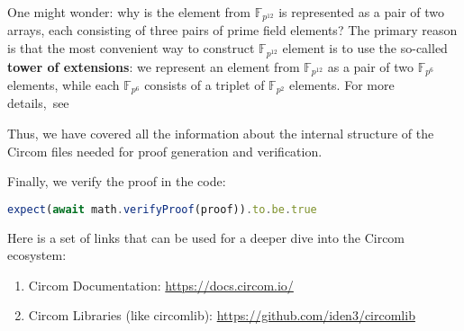 \documentclass[../lecture-notes.tex]{subfiles}
\begin{document}
    \begin{remark}
        One might wonder: why is the element from $\mathbb{F}_{p^{12}}$ is represented as a pair of two arrays,
        each consisting of three pairs of prime field elements? The primary reason is that the most convenient
        way to construct $\mathbb{F}_{p^{12}}$ element is to use the so-called \textbf{tower of extensions}: we represent
        an element from $\mathbb{F}_{p^{12}}$ as a pair of two $\mathbb{F}_{p^6}$ elements, while each $\mathbb{F}_{p^6}$
        consists of a triplet of $\mathbb{F}_{p^2}$ elements. For more details,~see~
    \end{remark}

    Thus, we have covered all the information about the internal structure of the Circom files needed for proof generation and verification.

    Finally, we verify the proof in the code:
    \begin{lstlisting}[language=TypeScript,numbers=none,basicstyle=\footnotesize\ttfamily\normalsize]
expect(await math.verifyProof(proof)).to.be.true
    \end{lstlisting}
    \begin{remark}
        \vspace{-1em}
        Here is a set of links that can be used for a deeper dive into the Circom ecosystem:
        \begin{enumerate}
            \item Circom Documentation: \url{https://docs.circom.io/}
            \item Circom Libraries (like circomlib): \url{https://github.com/iden3/circomlib}
        \end{enumerate}
    \end{remark}
\end{document}
